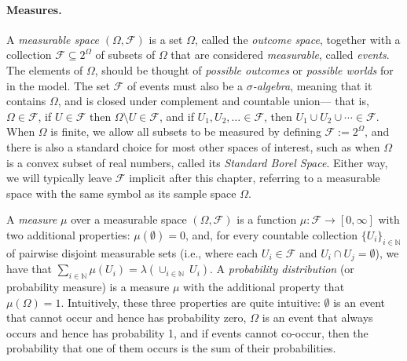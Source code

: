 \paragraph{Measures.}
A \emph{measurable space} $(\Omega, \mathcal F)$ is a set $\Omega$,
called the \emph{outcome space}, together with a collection $\mathcal F \subseteq 2^\Omega$ of subsets of $\Omega$ that are considered \emph{measurable}, called \emph{events}. 
The elements of $\Omega$, should be thought of \emph{possible outcomes} or \emph{possible worlds} for in the model.
The set $\mathcal F$ of events must also be a \emph{$\sigma$-algebra}, meaning that it contains $\Omega$, and is closed under complement and countable union---%
that is, $\Omega \in \mathcal F$, if $U \in \mathcal F$ then $\Omega \setminus U \in \mathcal F$, and if $U_1, U_2, \ldots \in \mathcal F$, then $U_1 \cup U_2 \cup \cdots \in \mathcal F$.  
When $\Omega$ is finite, we allow all subsets to be measured by defining $\mathcal F := 2^\Omega$,
    and there is also a standard choice for most other spaces of interest, such as when $\Omega$ is a convex subset of real numbers, called its \emph{Standard Borel Space}. 
Either way, we will typically leave $\mathcal F$ implicit after this chapter, referring to a measurable space with the same symbol as its sample space $\Omega$. 

A \emph{measure} $\mu$ over a measurable space $(\Omega, \mathcal F)$ is a function $\mu : \mathcal F \to [0,\infty]$ with two additional properties: $\mu(\emptyset) = 0$, and,
for every countable collection $\{ U_i \}_{i \in \mathbb N}$
of pairwise disjoint measurable sets (i.e., where each $U_i \in \mathcal F$ and $U_i \cap U_j = \emptyset$),  we have that
$\sum_{i \in \mathbb N} \mu(U_i) = \lambda( \cup_{i \in \mathbb N}~U_i)$. 
A \emph{probability distribution} (or probability measure) is a measure $\mu$ with the additional property that $\mu(\Omega) = 1$. 
%
Intuitively, these three properties are quite intuitive: $\emptyset$ is an event that cannot occur and hence has probability zero,
$\Omega$ is an event that always occurs and hence has probability 1, 
and if events cannot co-occur, then the probability that one of them occurs is the sum of their probabilities. 

